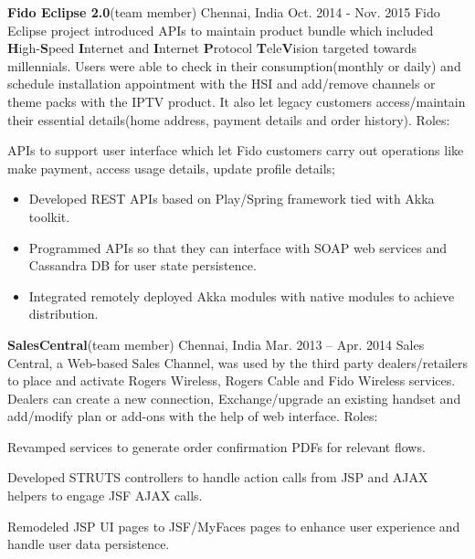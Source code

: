 \begin{cventries}
{\begin{cvitems}
\begin{itemize}
\end{itemize}
             \end{cvitems}
    }
    \experienceentry
    {\textbf{Fido Eclipse 2.0}(team member)}
    {}
    {Chennai, India}
    {Oct. 2014 - Nov. 2015}
    {Fido Eclipse project introduced APIs to maintain product bundle which included \textbf{H}igh-\textbf{S}peed \textbf{I}nternet and \textbf{I}nternet \textbf{P}rotocol \textbf{T}ele\textbf{V}ision targeted towards millennials. Users were able to check in their consumption(monthly or daily) and schedule installation appointment with the HSI and add/remove channels or theme packs with the IPTV product. It also let legacy customers access/maintain their essential details(home address, payment details and order history). 
}
    {Roles:}
    {
      \begin{cvitems}
        \item {APIs to support user interface which let Fido customers carry out operations like make payment, access usage details, update profile details;}
\begin{itemize}
\item Developed REST APIs based on Play/Spring framework tied with Akka toolkit.
\end{itemize}
\begin{itemize}
\item Programmed APIs so that they can interface with SOAP web services and Cassandra DB for user state persistence.
\end{itemize}
\begin{itemize}
\item Integrated remotely deployed Akka modules with native modules to achieve distribution. 
\end{itemize}
      \end{cvitems} 
    }

    \experienceentry
    {\textbf{SalesCentral}(team member)}
    {}
    {Chennai, India}
    {Mar. 2013 – Apr. 2014}
    {Sales Central, a Web-based Sales Channel, was used by the third party dealers/retailers to place and activate Rogers Wireless, Rogers Cable and Fido Wireless services. Dealers can create a new connection, Exchange/upgrade an existing handset and add/modify plan or add-ons with the help of web interface. }
    {Roles:}
    {\begin{cvitems}
        \item {Revamped services to generate order confirmation PDFs for relevant flows. }
        \item {Developed STRUTS controllers to handle action calls from JSP and AJAX helpers to engage JSF AJAX calls.}
        \item {Remodeled JSP UI pages to JSF/MyFaces pages to enhance user experience and handle user data persistence.}
      \end{cvitems}
    }
\end{cventries}
